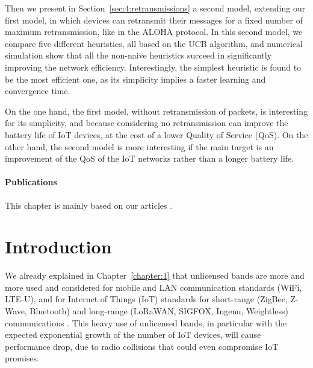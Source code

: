 Then we present in Section~\ref{sec:4:retransmissions} a second model, extending our first model, in which devices can retransmit their messages for a fixed number of maximum retransmission, like in the ALOHA protocol.
In this second model, we compare five different heuristics, all based on the UCB algorithm, and numerical simulation show that all the non-naive heuristics succeed in significantly improving the network efficiency.
Interestingly, the simplest heuristic is found to be the most efficient one, as its simplicity implies a faster learning and convergence time.

On the one hand, the first model, without retransmission of packets, is interesting for its simplicity, and because considering no retransmission can improve the battery life of IoT devices, at the cost of a lower Quality of Service (QoS).
On the other hand, the second model is more interesting if the main target is an improvement of the QoS of the IoT networks rather than a longer battery life.


\vfill{}

\paragraph{Publications}

This chapter is mainly based on our articles \cite{Bonnefoi17,Besson2018ICT,Besson2019WCNC,Bonnefoi2019WCNC}.

\newpage


\section{Introduction}
\label{sec:4:motivations}

We already explained in Chapter~\ref{chapter:1} that
unlicensed bands are more and more used and considered for mobile and LAN communication standards (WiFi, LTE-U), and for Internet of Things (IoT) standards for short-range (ZigBee, Z-Wave, Bluetooth) and long-range (LoRaWAN, SIGFOX, Ingenu, Weightless) communications \cite{Centenaro16}.
This heavy use of unlicensed bands, in particular with the expected exponential growth of the number of IoT devices, will cause performance drop, due to radio collisions that could even compromise IoT promises.

